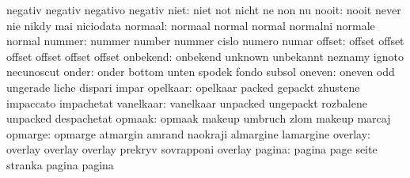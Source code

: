                            negativ                   negativ
                           negativo                  negativ
                     niet: niet                      not
                           nicht                     ne
                           non                       nu
                    nooit: nooit                     never
                           nie                       nikdy
                           mai                       niciodata
                  normaal: normaal                   normal
                           normal                    normalni
                           normale                   normal
                   nummer: nummer                    number
                           nummer                    cislo
                           numero                    numar
                   offset: offset                    offset
                           offset                    offset
                           offset                    offset
                 onbekend: onbekend                  unknown
                           unbekannt                 neznamy
                           ignoto                    necunoscut
                    onder: onder                     bottom
                           unten                     spodek
                           fondo                     subsol
                   oneven: oneven                    odd
                           ungerade                  liche
                           dispari                   impar
                 opelkaar: opelkaar                  packed
                           gepackt                   zhustene
                           impaccato                 impachetat
                vanelkaar: vanelkaar                 unpacked
                           ungepackt                 rozbalene
                           unpacked                  despachetat
                   opmaak: opmaak                    makeup
                           umbruch                   zlom
                           makeup                    marcaj
                  opmarge: opmarge                   atmargin
                           amrand                    naokraji
                           almargine                 lamargine
                  overlay: overlay                   overlay
                           overlay                   prekryv
                           sovrapponi                overlay
                   pagina: pagina                    page
                           seite                     stranka
                           pagina                    pagina
